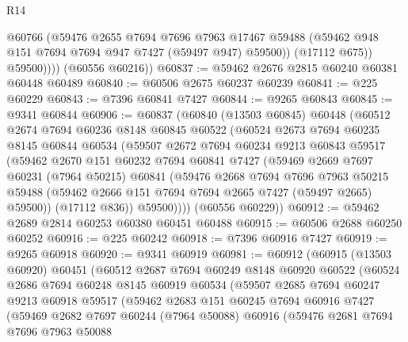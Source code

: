 \begin{lexlean}{R14}
\begin{coremodule}
                @60766
                (@59476
                  @2655
                  @7694
                  @7696
                  @7963
                  @17467
                  @59488
                  (@59462 @948 @151 @7694 @7694 @947 @7427 (@59497 @947) @59500))
                (@17112 @675))
              @59500))))
      (@60556 @60216))
@60837 := @59462 @2676 @2815 @60240 @60381 @60448 @60489
@60840 := @60506 @2675 @60237 @60239
@60841 := @225 @60229
@60843 := @7396 @60841 @7427
@60844 := @9265 @60843
@60845 := @9341 @60844
@60906 := @60837
    (@60840
      (@13503 @60845)
      @60448
      (@60512
        @2674
        @7694
        @60236
        @8148
        @60845
        @60522
        (@60524
          @2673
          @7694
          @60235
          @8145
          @60844
          @60534
          (@59507
            @2672
            @7694
            @60234
            @9213
            @60843
            @59517
            (@59462
              @2670
              @151
              @60232
              @7694
              @60841
              @7427
              (@59469
                @2669
                @7697
                @60231
                (@7964 @50215)
                @60841
                (@59476
                  @2668
                  @7694
                  @7696
                  @7963
                  @50215
                  @59488
                  (@59462 @2666 @151 @7694 @7694 @2665 @7427 (@59497 @2665) @59500))
                (@17112 @836))
              @59500))))
      (@60556 @60229))
@60912 := @59462 @2689 @2814 @60253 @60380 @60451 @60488
@60915 := @60506 @2688 @60250 @60252
@60916 := @225 @60242
@60918 := @7396 @60916 @7427
@60919 := @9265 @60918
@60920 := @9341 @60919
@60981 := @60912
    (@60915
      (@13503 @60920)
      @60451
      (@60512
        @2687
        @7694
        @60249
        @8148
        @60920
        @60522
        (@60524
          @2686
          @7694
          @60248
          @8145
          @60919
          @60534
          (@59507
            @2685
            @7694
            @60247
            @9213
            @60918
            @59517
            (@59462
              @2683
              @151
              @60245
              @7694
              @60916
              @7427
              (@59469
                @2682
                @7697
                @60244
                (@7964 @50088)
                @60916
                (@59476
                  @2681
                  @7694
                  @7696
                  @7963
                  @50088

\end{coremodule}
\end{lexlean}
